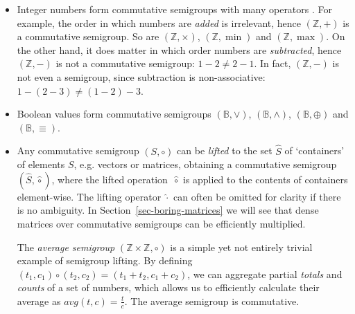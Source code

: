 \documentclass[11pt,letterpaper]{article}
\begin{document}
\begin{itemize}
  \item Integer numbers form commutative semigroups with many operators
  {}. For
  example, the order in which numbers are \emph{added} is irrelevant, hence
  $(\mathbb{Z}, +)$ is a commutative semigroup. So are $(\mathbb{Z}, \times)$,
  $(\mathbb{Z}, \min)$ and $(\mathbb{Z}, \max)$. On the other hand, it does
  matter in which order numbers are \emph{subtracted}, hence $(\mathbb{Z}, -)$
  is not a commutative semigroup: $1-2 \neq 2-1$. In fact, $(\mathbb{Z}, -)$
  is not even a semigroup, since subtraction is non-associative:
  $1-(2-3) \neq (1-2)-3$.

  \item Boolean values form commutative semigroups $(\mathbb{B}, \vee)$,
  $(\mathbb{B}, \wedge)$, $(\mathbb{B}, \oplus)$ and $(\mathbb{B}, \equiv)$.

  \item Any commutative semigroup $(S, \circ)$ can be \emph{lifted} to the set
  $\hat{S}$ of `containers' of elements $S$, e.g. vectors or matrices,
  obtaining a commutative semigroup $(\hat{S}, \hat{\circ})$, where the lifted
  operation~$\hat{\circ}$ is applied to the contents of containers element-wise.
  The lifting operator $\hat{\cdot}$
  {} 
  can often be omitted for clarity if there
  is no ambiguity. In Section~\ref{sec-boring-matrices} we will see that dense
  matrices over commutative semigroups can be efficiently multiplied.

  The \emph{average semigroup} $(\mathbb{Z} \times \mathbb{Z}, \circ)$ is a
  simple yet not entirely trivial example of semigroup lifting. By defining
  $(t_1, c_1) \circ (t_2, c_2) = (t_1 + t_2, c_1 + c_2)$, we can aggregate
  partial \emph{totals} and \emph{counts} of a set of numbers, which allows us
  to efficiently calculate their average as $\textit{avg}(t, c) = \frac{t}{c}$.
  The average semigroup is commutative.


\end{itemize}
\end{document}

